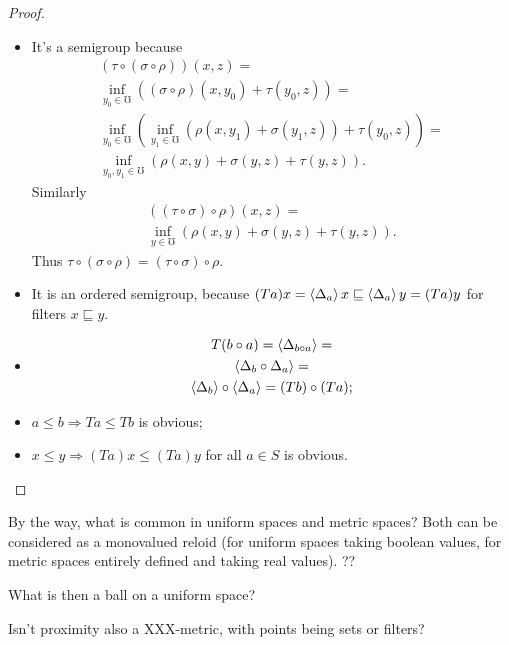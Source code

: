 \begin{proof}
~
\begin{itemize}
\item It's a semigroup because
\begin{multline*}
(\tau\circ(\sigma\circ\rho))(x,z) = \\
\inf_{y_0\in\mho}((\sigma\circ\rho)(x,y_0)+\tau(y_0,z)) = \\
\inf_{y_0\in\mho}(\inf_{y_1\in\mho}(\rho(x,y_1)+\sigma(y_1,z))+\tau(y_0,z)) = \\
\inf_{y_0,y_1\in\mho}(\rho(x,y)+\sigma(y,z)+\tau(y,z)).
\end{multline*}
Similarly 
\begin{multline*}
((\tau\circ\sigma)\circ\rho)(x,z) = \\
\inf_{y\in\mho}(\rho(x,y)+\sigma(y,z)+\tau(y,z)).
\end{multline*}
Thus $\tau\circ(\sigma\circ\rho)=(\tau\circ\sigma)\circ\rho$.

\item It is an ordered semigroup, because
$(Ta)x = \left\langle \Delta_a\right\rangle x \sqsubseteq \left\langle \Delta_a\right\rangle y = (Ta)y$ 
for filters $x\sqsubseteq y$.

\item
\begin{multline*}
T(b\circ a) = \left\langle \Delta_{b\circ a}\right\rangle = \\ \left\langle \Delta_b\circ\Delta_a\right\rangle = \\ \left\langle \Delta_b\right\rangle\circ\left\langle \Delta_a\right\rangle = (Tb)\circ(Ta);
\end{multline*}
\item $a\leq b\Rightarrow Ta\leq Tb$ is obvious;
\item $x\leq y\Rightarrow(Ta)x\leq (Ta)y$ for all $a\in S$ is obvious.
\end{itemize}
\end{proof}

By the way, what is common in uniform spaces and metric spaces? Both can be considered as a monovalued reloid (for uniform spaces taking boolean values, for metric spaces entirely defined and taking real values). ??

What is then a ball on a uniform space?

Isn't proximity also a XXX-metric, with points being sets or filters?
